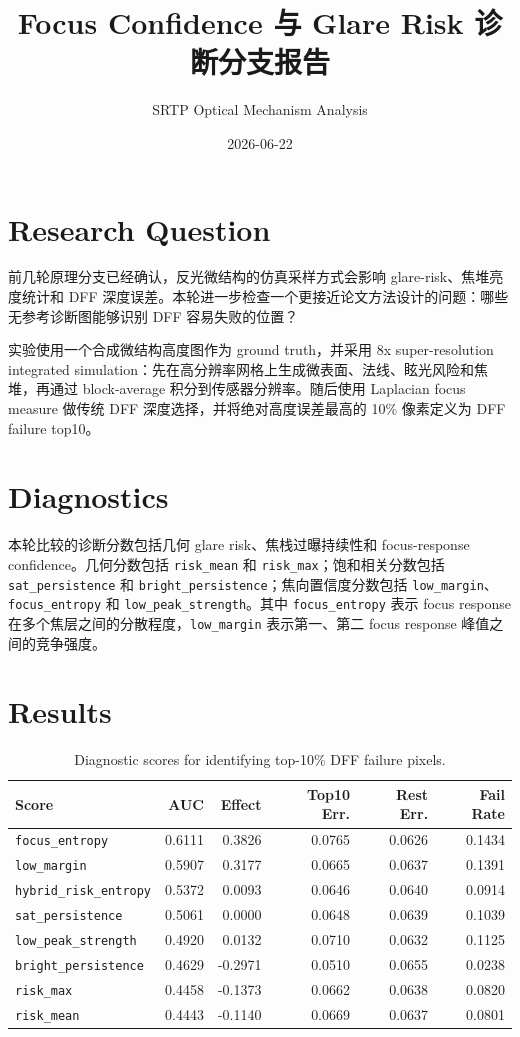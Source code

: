 \documentclass[11pt]{article}
\title{Focus Confidence 与 Glare Risk 诊断分支报告}
\author{SRTP Optical Mechanism Analysis}
\date{2026-06-22}
\begin{document}
\maketitle

\section{Research Question}

前几轮原理分支已经确认，反光微结构的仿真采样方式会影响 glare-risk、焦堆亮度统计和 DFF 深度误差。本轮进一步检查一个更接近论文方法设计的问题：哪些无参考诊断图能够识别 DFF 容易失败的位置？

实验使用一个合成微结构高度图作为 ground truth，并采用 8x super-resolution integrated simulation：先在高分辨率网格上生成微表面、法线、眩光风险和焦堆，再通过 block-average 积分到传感器分辨率。随后使用 Laplacian focus measure 做传统 DFF 深度选择，并将绝对高度误差最高的 10\% 像素定义为 DFF failure top10。

\section{Diagnostics}

本轮比较的诊断分数包括几何 glare risk、焦栈过曝持续性和 focus-response confidence。几何分数包括 \texttt{risk\_mean} 和 \texttt{risk\_max}；饱和相关分数包括 \texttt{sat\_persistence} 和 \texttt{bright\_persistence}；焦向置信度分数包括 \texttt{low\_margin}、\texttt{focus\_entropy} 和 \texttt{low\_peak\_strength}。其中 \texttt{focus\_entropy} 表示 focus response 在多个焦层之间的分散程度，\texttt{low\_margin} 表示第一、第二 focus response 峰值之间的竞争强度。

\section{Results}

\begin{table}[htbp]
\centering
\small
\begin{tabular}{lrrrrr}
\toprule
Score & AUC & Effect & Top10 Err. & Rest Err. & Fail Rate \\
\midrule
\texttt{focus\_entropy} & 0.6111 & 0.3826 & 0.0765 & 0.0626 & 0.1434 \\
\texttt{low\_margin} & 0.5907 & 0.3177 & 0.0665 & 0.0637 & 0.1391 \\
\texttt{hybrid\_risk\_entropy} & 0.5372 & 0.0093 & 0.0646 & 0.0640 & 0.0914 \\
\texttt{sat\_persistence} & 0.5061 & 0.0000 & 0.0648 & 0.0639 & 0.1039 \\
\texttt{low\_peak\_strength} & 0.4920 & 0.0132 & 0.0710 & 0.0632 & 0.1125 \\
\texttt{bright\_persistence} & 0.4629 & -0.2971 & 0.0510 & 0.0655 & 0.0238 \\
\texttt{risk\_max} & 0.4458 & -0.1373 & 0.0662 & 0.0638 & 0.0820 \\
\texttt{risk\_mean} & 0.4443 & -0.1140 & 0.0669 & 0.0637 & 0.0801 \\
\bottomrule
\end{tabular}
\caption{Diagnostic scores for identifying top-10\% DFF failure pixels.}
\end{table}
\end{document}
